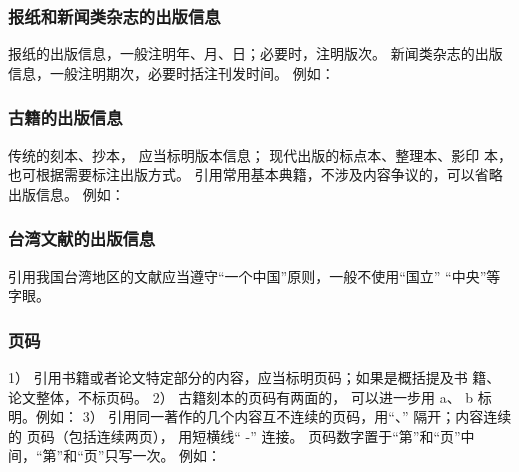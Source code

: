 \documentclass{article}
\begin{document}
\subsubsection{报纸和新闻类杂志的出版信息}
报纸的出版信息，一般注明年、月、日；必要时，注明版次。
新闻类杂志的出版信息，一般注明期次，必要时括注刊发时间。
例如：

\begin{quotation}

\end{quotation}


\subsubsection{古籍的出版信息}
传统的刻本、抄本， 应当标明版本信息； 现代出版的标点本、整理本、影印
本， 也可根据需要标注出版方式。
引用常用基本典籍，不涉及内容争议的，可以省略出版信息。
例如：


\begin{quotation}





\end{quotation}


\subsubsection{台湾文献的出版信息}
引用我国台湾地区的文献应当遵守“一个中国”原则，一般不使用“国立”
“中央”等字眼。

\subsubsection{页码}

1） 引用书籍或者论文特定部分的内容，应当标明页码；如果是概括提及书
籍、 论文整体，不标页码。 
2） 古籍刻本的页码有两面的， 可以进一步用 a、 b 标明。例如：
3） 引用同一著作的几个内容互不连续的页码，用“、” 隔开；内容连续的
页码（包括连续两页）， 用短横线“ -” 连接。 页码数字置于“第”和“页”中
间，“第”和“页”只写一次。
例如：
\end{document}
